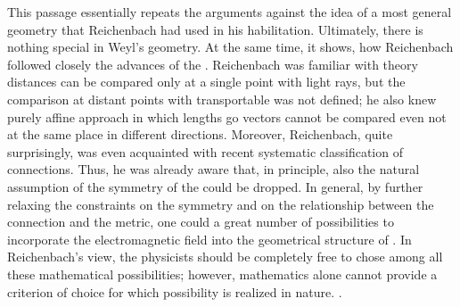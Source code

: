 \documentclass[draft]{article}
\newcommand{\WG}{Weyl's geometry\xspace}
\begin{document}
%
This passage essentially repeats the arguments against the idea of a most general geometry that Reichenbach had used in his habilitation. Ultimately, there is nothing special in \WG. At the same time, it shows, how Reichenbach followed closely the advances of the \uftp. Reichenbach was familiar with   theory distances can be compared only at a single point with light rays, but the comparison at distant points with transportable \rac was not defined; he also knew  purely affine approach in which lengths go vectors cannot be compared even not at the same place in different directions. Moreover, Reichenbach, quite surprisingly, was even acquainted with  recent systematic classification of connections. Thus, he was already aware that, in principle, also the natural assumption of the symmetry of the \Gtmn could be dropped. In general, by further relaxing the constraints on the symmetry and on the relationship between the connection and the metric, one could a great number of possibilities to incorporate the electromagnetic field into the geometrical structure of \spti. In Reichenbach's view, the physicists should be completely free to chose among all these mathematical possibilities; however, mathematics alone cannot provide a criterion of choice for which possibility is realized in nature. .

\end{document}

